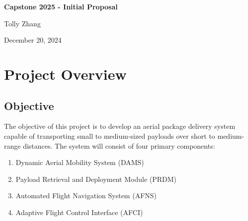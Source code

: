 \documentclass[12pt]{article}
\begin{document}
\begin{titlepage}
    \centering
    \vfill
    \vspace*{2.5in}
    {\Huge\bfseries Capstone 2025 - Initial Proposal \par}
    \vspace{0.2in}
    {\LARGE Tolly Zhang \par}    
    \vspace{0.2in}
    {\LARGE December 20, 2024 \par}
    \vfill
\end{titlepage}

\newpage
\section{Project Overview}
\subsection{Objective}
The objective of this project is to develop an aerial package delivery system capable of transporting small to medium-sized payloads over short to medium-range distances. The system will consist of four primary components:
\begin{enumerate}
    \item Dynamic Aerial Mobility System (DAMS)
    \item Payload Retrieval and Deployment Module (PRDM)
    \item Automated Flight Navigation System (AFNS)
    \item Adaptive Flight Control Interface (AFCI)
\end{enumerate}
\end{document}
